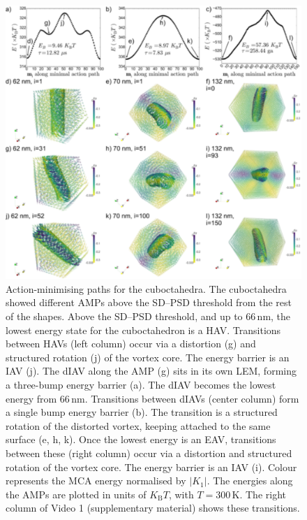 \documentclass[review,authoryear]{elsarticle}
\newcommand{\nm}{\,\text{nm}}
\begin{document}
\begin{figure}[ht]
\centering
\includegraphics[width=\textwidth]{Figure_08.pdf}
\caption{Action-minimising paths for the cuboctahedra. The cuboctahedra showed different AMPs above the SD--PSD threshold from the rest of the shapes. Above the SD--PSD threshold, and up to 66$\nm$, the lowest energy state for the cuboctahedron is a HAV. Transitions between HAVs (left column) occur via a distortion (g) and structured rotation (j) of the vortex core. The energy barrier is an IAV (j). The dIAV along the AMP (g) sits in its own LEM, forming a three-bump energy barrier (a). The dIAV becomes the lowest energy from 66$\nm$. Transitions between dIAVs (center column) form a single bump energy barrier (b). The transition is a structured rotation of the distorted vortex, keeping attached to the same surface (e, h, k). Once the lowest energy is an EAV, transitions between these (right column) occur via a distortion and structured rotation of the vortex core. The energy barrier is an IAV (i). Colour represents the MCA energy normalised by $|K_1|$. The energies along the AMPs are plotted in units of $K_\text{B}T$, with $T=300\,\text{K}$. The right column of Video 1 (supplementary material) shows these transitions.}
\label{fig8}
\end{figure}
\end{document}
